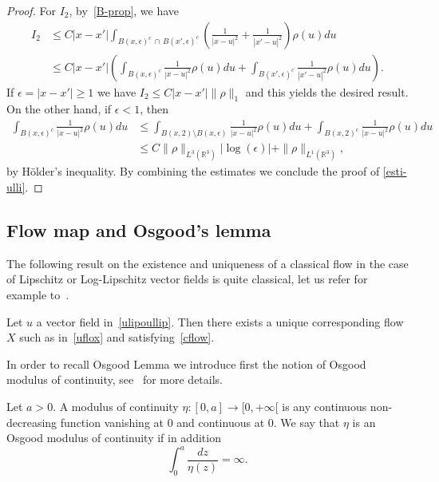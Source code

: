 \documentclass[AHL,Unicode,longabstracts,published]{cedram}
\newcommand{\R}{\mathbb{R}}
\renewcommand{\leq}{\leqslant}
\renewcommand{\geq}{\geqslant}
\begin{document}
\begin{proof}
For $I_2$, by~\eqref{B-prop}, we have
\begin{align*}
I_2 &\leq C |x-x'| \int_{B(x,\epsilon)^c\,\cap\,B(x',\epsilon)^c} \left(\frac{1}{|x-u|^2}+\frac{1}{|x'-u|^2} \right)\rho(u) du\\
&\leq C |x-x'|\left(\int_{B(x,\epsilon)^c} \frac{1}{|x-u|^2} \rho(u) du+ \int_{B(x',\epsilon)^c} \frac{1}{|x'-u|^2} \rho(u) du\right).
\end{align*}
If $\epsilon=|x-x'|\geq 1$ we have $I_2\leq C |x-x'|\| \rho\|_1$ and this yields the desired result. On the other hand, if $\epsilon<1$, then
\begin{align*}
\int_{B(x,\epsilon)^c} \frac{1}{|x-u|^2} \rho(u) du &\leq \int_{B(x,2)\setminus B(x,\epsilon)} \frac{1}{|x-u|^2} \rho(u) du + \int_{B(x,2)^c} \frac{1}{|x-u|^2} \rho(u) du\\
&\leq C\|\rho\|_{L^3 \left(\R^3\right)} | \log(\epsilon)|+ \|\rho\|_{L^1 \left(\R^3\right)},
\end{align*}
by H\"older's inequality. By combining the estimates we conclude the proof of \eqref{esti-ulli}.
\end{proof}



\subsection{Flow map and Osgood's lemma}

The following result on the existence and uniqueness of a classical flow in the case of Lipschitz or Log-Lipschitz vector fields is quite classical, let us refer for example to~\cite{BCD}.

\begin{prop}\label{prop_flow}
Let $u$ a vector field in~\eqref{ulipoullip}. Then there exists a unique corresponding flow $X$ such as in~\eqref{uflox} and satisfying~\eqref{cflow}.
\end{prop}

In order to recall Osgood Lemma we introduce first the notion of Osgood modulus of continuity, see~\cite[Definition~3.1]{BCD} for more details.

\begin{defi}
Let $a>0$. A modulus of continuity $ \eta: [0,a] \to [0,+\infty[$ is any continuous non-decreasing function vanishing at $0$ and continuous at $0$. We say that $\eta$ is an Osgood modulus of continuity if in addition
\[
\int_0^a \frac{dz}{\eta(z)} = \infty.
\]
\end{defi}
\end{document}
